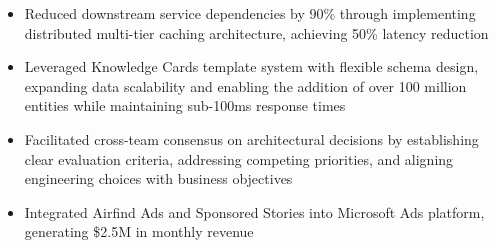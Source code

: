 \begin{itemize}
    \item \small{Reduced downstream service dependencies by 90\% through implementing distributed multi-tier caching architecture, achieving 50\% latency reduction}

    \item \small{Leveraged Knowledge Cards template system with flexible schema design, expanding data scalability and enabling the addition of over 100 million entities while maintaining sub-100ms response times}

    \item \small{Facilitated cross-team consensus on architectural decisions by establishing clear evaluation criteria, addressing competing priorities, and aligning engineering choices with business objectives}



    \item \small{Integrated Airfind Ads and Sponsored Stories into Microsoft Ads platform, generating \$2.5M in monthly revenue}

\end{itemize}